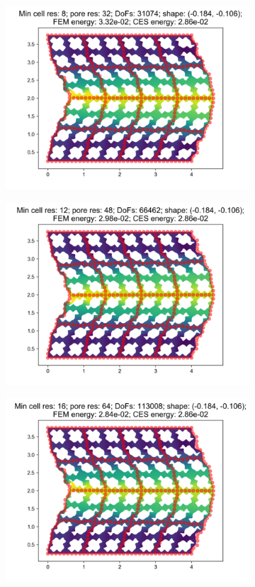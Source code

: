 \begin{figure}[H]
\begin{subfigure}{.45\textwidth}
\end{subfigure}
\begin{subfigure}{.45\textwidth}
  \centering
  \includegraphics[width=.8\linewidth]{lces/vis_compression/bm_5_mesh_3.png}
\end{subfigure}
\newline
\begin{subfigure}{.45\textwidth}
  \centering
  \includegraphics[width=.8\linewidth]{lces/vis_compression/bm_5_mesh_4.png}
\end{subfigure}
\begin{subfigure}{.45\textwidth}
  \centering
  \includegraphics[width=.8\linewidth]{lces/vis_compression/bm_5_mesh_5.png}
\end{subfigure}
\end{figure}

